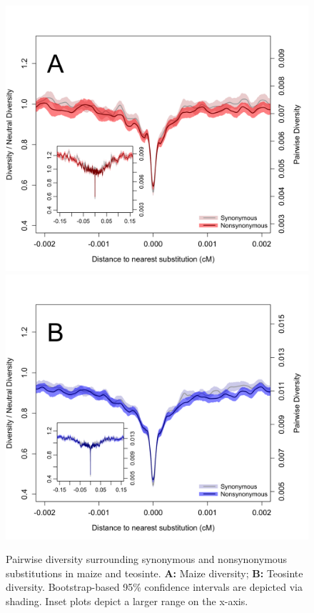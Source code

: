 \documentclass{pnastwo}
\newcommand{\jri}[1]{\textcolor{blue}{\emph{#1}} }
\begin{document}
\begin{article}
\begin{figure}[b]
\centering
\includegraphics[width=.45\textwidth]{FigsAndFiles/plotDiversity_TvM_Folded2_Significance_June}
\hspace{0.05\textwidth} \includegraphics[width=.45\textwidth]{FigsAndFiles/plotDiversity_TvT_Folded2_Significance_June}
\caption{Pairwise diversity surrounding synonymous and nonsynonymous
  substitutions in maize and teosinte. {\bf A:} Maize diversity; {\bf B:} Teosinte
diversity. Bootstrap-based 95\% confidence intervals are depicted via shading. Inset plots depict a larger range on the x-axis. \label{fig:hardSweeps}}
\end{figure}



\end{article}
\end{document}
